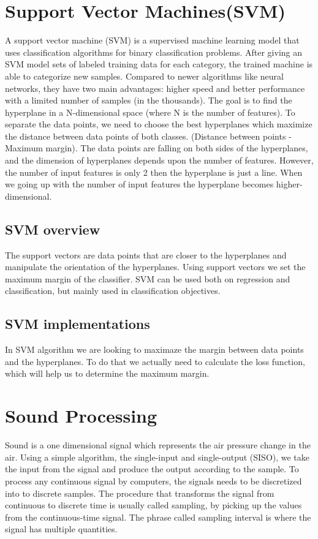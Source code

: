 \documentclass[english,12pt,oneside,a4paper]{article}
\begin{document}
\begin{center}
		\section{Support Vector Machines(SVM)}
		A support vector machine (SVM) is a supervised machine learning model that uses classification algorithms for binary classification problems. After giving an SVM model sets of labeled training data for each category, the trained machine is able to categorize new samples. Compared to newer algorithms like neural networks, they have two main advantages: higher speed and better performance with a limited number of samples (in the thousands).
		The goal is to find the hyperplane in a N-dimensional space (where N is the number of features). To separate the data points, we need to choose the best hyperplanes which maximize the distance between data points of both classes. (Distance between points - Maximum margin). The data points are falling on both sides of the hyperplanes, and the dimension of hyperplanes depends upon the number of features. However, the number of input features is only 2 then the hyperplane is just a line. When we going up with the number of input features the hyperplane becomes higher-dimensional.
		\subsection{SVM overview}
		The support vectors are data points that are closer to the hyperplanes and manipulate the orientation of the hyperplanes. Using support vectors we set the maximum margin of the classifier.
		SVM can be used both on regression and classification, but mainly used in classification objectives.
		\subsection{SVM implementations}
		In SVM algorithm we are looking to maximaze the margin between data points and the hyperplanes. To do that we actually need to calculate the loss function, which will help us to determine the maximum margin.
		\section{Sound Processing}
		Sound is a one dimensional signal which represents the air pressure change in the air. Using a simple algorithm, the single-input and single-output (SISO), we take the input from the signal and produce the output according to the sample. To process any continuous signal by computers, the signals needs to be discretized into to discrete samples. The procedure that transforms the signal from continuous to discrete time is usually called sampling, by picking up the values from the continuous-time signal. The phrase called sampling interval is where the signal has multiple quantities.

\end{center}
\end{document}
